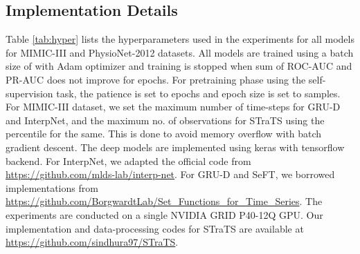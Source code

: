 \subsection{Implementation Details}
Table \ref{tab:hyper} lists the hyperparameters  used in the experiments for all models for MIMIC-III and PhysioNet-2012 datasets.
All models are trained using a batch size of  with Adam optimizer and training is stopped when sum of ROC-AUC and PR-AUC does not improve for  epochs. 
For pretraining phase using the self-supervision task, the patience is set to  epochs and epoch size is set to  samples.
For MIMIC-III dataset, we set the maximum number of time-steps for GRU-D and InterpNet, and the maximum no. of observations for STraTS using the  percentile for the same. This is done to avoid memory overflow with batch gradient descent.
The deep models are implemented using keras with tensorflow backend. 
For InterpNet, we adapted the official code from \url{https://github.com/mlds-lab/interp-net}. For GRU-D and SeFT, we borrowed implementations from \url{https://github.com/BorgwardtLab/Set_Functions_for_Time_Series}.
The experiments are conducted on a single NVIDIA GRID P40-12Q GPU. Our implementation and data-processing codes for STraTS are available at \url{https://github.com/sindhura97/STraTS}. 





\begin{comment}
\begin{table}[h!]
    \centering
    \begin{tabular}{|l|cc|}
      \hline
       &macro ROC-AUC &micro ROC-AUC\\
      \hline
      RF & & \\
      GRU & &\\
      GRU-D & &\\
      TCN & & \\
      InterpNet & & \\
      \hline
      STraTS  & & \\
      STraTS & & \\
      STraTS & & \\
      STraTS & &\\
      \hline
    \end{tabular}
    \caption{Phenotype classification performance on MIMIC-III dataset.}
    \label{tab:pred_phen}
\end{table}
\end{comment}

